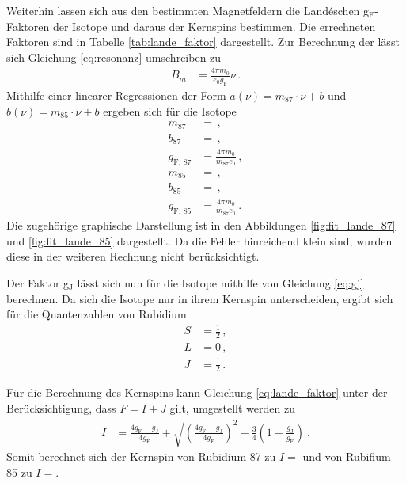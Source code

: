 Weiterhin lassen sich aus den bestimmten Magnetfeldern die Landéschen g$_\text{F}$-Faktoren der Isotope und daraus der Kernspins bestimmen.
Die errechneten Faktoren sind in Tabelle \ref{tab:lande_faktor} dargestellt.
Zur Berechnung der lässt sich Gleichung \eqref{eq:resonanz} umschreiben zu
\begin{align*}
    B_m &= \frac{4 \pi m_0}{e_0 g_\text{F}} \nu \,.
\end{align*}
Mithilfe einer linearer Regressionen der Form $a(\nu)=m_\text{87} \cdot \nu + b$ und $b(\nu)=m_\text{85} \cdot \nu + b$ ergeben sich für die Isotope
\begin{align*}
    m_{87} &= \,,\\
    b_{87} &= \,,\\
    g_\text{F, 87} &= \frac{4 \pi m_0}{m_{87} e_0}\,,\\
    m_{85} &= \,,\\
    b_{85} &= \,,\\
    g_\text{F, 85} &= \frac{4 \pi m_0}{m_{87} e_0}\,.
\end{align*}
Die zugehörige graphische Darstellung ist in den Abbildungen \ref{fig:fit_lande_87} und \ref{fig:fit_lande_85} dargestellt.
Da die Fehler hinreichend klein sind, wurden diese in der weiteren Rechnung nicht berücksichtigt.

Der Faktor g$_\text{J}$ lässt sich nun für die Isotope mithilfe von Gleichung \ref{eq:gj} berechnen.
Da sich die Isotope nur in ihrem Kernspin unterscheiden, ergibt sich für die Quantenzahlen von Rubidium
\begin{align*}
    S &= \frac{1}{2}\,,\\
    L &= 0\,,\\
    J &= \frac{1}{2}\,.
\end{align*}

Für die Berechnung des Kernspins kann Gleichung \ref{eq:lande_faktor} unter der Berücksichtigung, dass $F = I + J$ gilt, umgestellt werden zu
\begin{align*}
    I &= \frac{4 g_\text{F} - g_\text{J}}{4 g_\text{F}} + \sqrt{\left(\frac{4 g_\text{F} - g_\text{J}}{4 g_\text{F}}\right)^2 - \frac{3}{4}(1 - \frac{g_\text{J}}{g_\text{F}})} \,.
\end{align*}
Somit berechnet sich der Kernspin von Rubidium 87 zu $I = $ und von Rubifium 85 zu $I = $.

